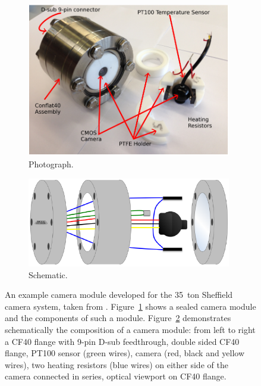 \begin{figure}
  \centering
  \begin{subfigure}[t]{0.48\linewidth}
    \centering
    \includegraphics[width=0.98\textwidth]{35tonCameraPhoto.pdf}
    \caption{Photograph.}
    \label{fig:35tonCameraPhoto}
  \end{subfigure}
  \hfill
  \begin{subfigure}[t]{0.48\linewidth}
    \centering
    \includegraphics[width=0.98\textwidth]{35tonCameraSchematic.pdf}
    \caption{Schematic.}
    \label{fig:35tonCameraSchematic}
  \end{subfigure}
  \caption[An example camera module developed for the 35~ton Sheffield camera system.]{An example camera module developed for the 35~ton Sheffield camera system, taken from \cite{35tonCameras2017}.  Figure~\ref{fig:35tonCameraPhoto} shows a sealed camera module and the components of such a module.  Figure~\ref{fig:35tonCameraSchematic} demonstrates schematically the composition of a camera module: from left to right a CF40 flange with 9-pin D-sub feedthrough, double sided CF40 flange, PT100 sensor (green wires), camera (red, black and yellow wires), two heating resistors (blue wires) on either side of the camera connected in series, optical viewport on CF40 flange.}
  \label{fig:35tonCamera}
\end{figure}


